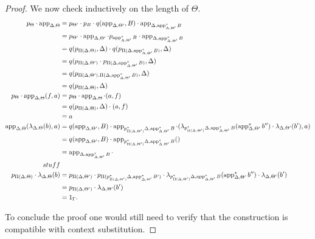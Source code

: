 \begin{proof}
  We now check inductively on the length of $\Theta$.
  \begin{align*}
    p_{\Theta}\cdot\operatorname{app}_{\Delta,\Theta}
    &=p_{\Theta'}\cdot
    p_B\cdot
    q(\operatorname{app}_{\Delta,\Theta'},B)\cdot
    \operatorname{app}_{\Delta,\operatorname{app}^*_{\Delta,\Theta'}B} \\
    &=p_{\Theta'}\cdot
    \operatorname{app}_{\Delta,\Theta'}\cdot
    p_{\operatorname{app}^*_{\Delta,\Theta'}B}\cdot
    \operatorname{app}_{\Delta,\operatorname{app}^*_{\Delta,\Theta'}B} \\
    &=q(p_{\Pi(\Delta,\Theta)},\Delta)\cdot
    q(p_{\Pi(\Delta,\operatorname{app}^*_{\Delta,\Theta'}B)},\Delta) \\
    &=q(p_{\Pi(\Delta,\Theta')}\cdot
    p_{\Pi(\Delta,\operatorname{app}^*_{\Delta,\Theta'}B)},\Delta) \\
    &=q(p_{\Pi(\Delta,\Theta').\Pi(\Delta,\operatorname{app}^*_{\Delta,\Theta'}B)},\Delta) \\
    &=q(p_{\Pi(\Delta,\Theta)},\Delta) \\
    p_\Theta\cdot\operatorname{app}_{\Delta,\Theta}(f,a)
    &=p_\Theta\cdot\operatorname{app}_{\Delta,\Theta}\cdot(a,f) \\
    &=q(p_{\Pi(\Delta,\Theta)},\Delta)\cdot(a,f) \\
    &=a \\
    \operatorname{app}_{\Delta,\Theta}(\lambda_{\Delta,\Theta}(b),a)
    &=q(\operatorname{app}_{\Delta,\Theta'},B)\cdot
    \operatorname{app}_{p^*_{\Pi(\Delta,\Theta')}\Delta,\operatorname{app}^*_{\Delta,\Theta'}B}\cdot
    (\lambda_{p^*_{\Pi(\Delta,\Theta')}\Delta,\operatorname{app}^*_{\Delta,\Theta'}B}(\operatorname{app}_{\Delta,\Theta'}^*b'')\cdot\lambda_{\Delta,\Theta'}(b'),a) \\
    &=q(\operatorname{app}_{\Delta,\Theta'},B)\cdot
    \operatorname{app}_{p^*_{\Pi(\Delta,\Theta')}\Delta,\operatorname{app}^*_{\Delta,\Theta'}B}
    () \\
    &=\operatorname{app}_{\Delta,\operatorname{app}^*_{\Delta,\Theta'}B}\cdot \\
    stuff \\
    p_{\Pi(\Delta,\Theta)}\cdot
    \lambda_{\Delta,\Theta}(b)
    &=p_{\Pi(\Delta,\Theta')}\cdot
    p_{\Pi(p_{\Pi(\Delta,\Theta')}^*\Delta,\operatorname{app}^*_{\Delta,\Theta'}B')}\cdot
    \lambda_{p^*_{\Pi(\Delta,\Theta')}\Delta,\operatorname{app}^*_{\Delta,\Theta'}B}(\operatorname{app}_{\Delta,\Theta'}^*b'')\cdot
    \lambda_{\Delta,\Theta'}(b') \\
    &=p_{\Pi(\Delta,\Theta')}\cdot
    \lambda_{\Delta,\Theta'}(b') \\
    &=1_\Gamma.
  \end{align*}

  To conclude the proof one would still need to verify that the construction is
  compatible with context substitution.
\end{proof}


